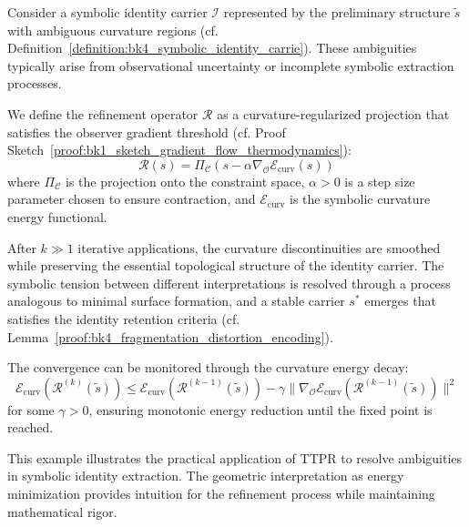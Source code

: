 \begin{demonstratio}
\label{example:bk4_ttpr_identity_refinement}
Consider a symbolic identity carrier $\mathcal{I}$ represented by the preliminary structure $\tilde{s}$ with ambiguous curvature regions (cf. Definition~\ref{definition:bk4_symbolic_identity_carrie}). These ambiguities typically arise from observational uncertainty or incomplete symbolic extraction processes.

We define the refinement operator $\mathcal{R}$ as a curvature-regularized projection that satisfies the observer gradient threshold (cf. Proof Sketch~\ref{proof:bk1_sketch_gradient_flow_thermodynamics}):
\[
\mathcal{R}(s) = \Pi_{\mathcal{C}} \left( s - \alpha \nabla_{\mathcal{O}} \mathcal{E}_{\text{curv}}(s) \right)
\]
where $\Pi_{\mathcal{C}}$ is the projection onto the constraint space, $\alpha > 0$ is a step size parameter chosen to ensure contraction, and $\mathcal{E}_{\text{curv}}$ is the symbolic curvature energy functional.

After $k \gg 1$ iterative applications, the curvature discontinuities are smoothed while preserving the essential topological structure of the identity carrier. The symbolic tension between different interpretations is resolved through a process analogous to minimal surface formation, and a stable carrier $s^*$ emerges that satisfies the identity retention criteria (cf. Lemma~\ref{proof:bk4_fragmentation_distortion_encoding}).

The convergence can be monitored through the curvature energy decay:
\[
\mathcal{E}_{\text{curv}}(\mathcal{R}^{(k)}(\tilde{s})) \le \mathcal{E}_{\text{curv}}(\mathcal{R}^{(k-1)}(\tilde{s})) - \gamma \|\nabla_{\mathcal{O}} \mathcal{E}_{\text{curv}}(\mathcal{R}^{(k-1)}(\tilde{s}))\|^2
\]
for some $\gamma > 0$, ensuring monotonic energy reduction until the fixed point is reached.
\end{demonstratio}

This example illustrates the practical application of TTPR to resolve ambiguities in symbolic identity extraction. The geometric interpretation as energy minimization provides intuition for the refinement process while maintaining mathematical rigor.

